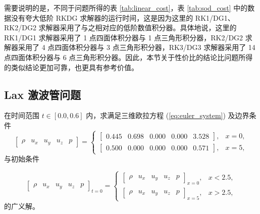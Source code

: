 需要说明的是，不同于问题所得的表
\ref{tab:linear_cost}，表 \ref{tab:sod_cost} 中的数据没有夸大低阶 RKDG 求解器的运行时间，这是因为这里的
RK1/DG1、RK2/DG2 求解器采用了与之相对应的低阶数值积分器。具体地说，这里的 RK1/DG1 求解器采用了 1 点四面体积分器与
1 点三角形积分器，RK2/DG2 求解器采用了 4 点四面体积分器与 3 点三角形积分器，RK3/DG3 求解器采用了 14 点四面体积分器与
6 点三角形积分器。因此，本节关于性价比的结论比问题所得的类似结论更加可靠，也更具有参考价值。

\newpage{}

\subsection{Lax 激波管问题}
\begin{problem}
\label{prob:Lax-=006FC0=006CE2=007BA1}在时间范围 $t\in[0.0,0.6]$
内，求满足三维欧拉方程 (\ref{eq:euler_system}) 及边界条件
\begin{equation}
\begin{bmatrix}\rho & u_{x} & u_{y} & u_{z} & p\end{bmatrix}=\begin{cases}
\begin{bmatrix}0.445 & 0.698 & 0.000 & 0.000 & 3.528\end{bmatrix}, & x=0,\\
\begin{bmatrix}0.500 & 0.000 & 0.000 & 0.000 & 0.571\end{bmatrix}, & x=5,
\end{cases}
\end{equation}
与初始条件

\begin{equation}
\begin{bmatrix}\rho & u_{x} & u_{y} & u_{z} & p\end{bmatrix}_{t=0}=\begin{cases}
\begin{bmatrix}\rho & u_{x} & u_{y} & u_{z} & p\end{bmatrix}_{x=0}, & x<2.5,\\
\begin{bmatrix}\rho & u_{x} & u_{y} & u_{z} & p\end{bmatrix}_{x=5}, & x>2.5,
\end{cases}
\end{equation}
的广义解。
\end{problem}

